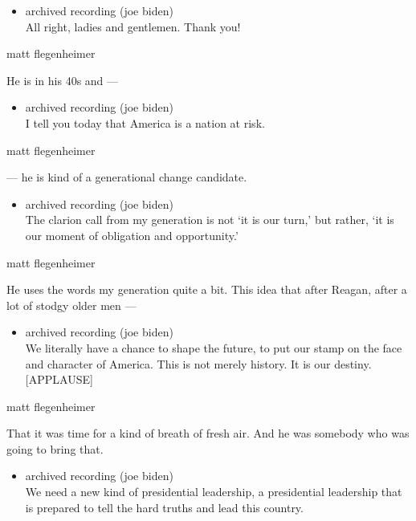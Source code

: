 \begin{itemize}
\tightlist
\item
  archived recording (joe biden)\\
  All right, ladies and gentlemen. Thank you!
\end{itemize}

matt flegenheimer

He is in his 40s and ---

\begin{itemize}
\tightlist
\item
  archived recording (joe biden)\\
  I tell you today that America is a nation at risk.
\end{itemize}

matt flegenheimer

--- he is kind of a generational change candidate.

\begin{itemize}
\tightlist
\item
  archived recording (joe biden)\\
  The clarion call from my generation is not `it is our turn,' but
  rather, `it is our moment of obligation and opportunity.'
\end{itemize}

matt flegenheimer

He uses the words my generation quite a bit. This idea that after
Reagan, after a lot of stodgy older men ---

\begin{itemize}
\tightlist
\item
  archived recording (joe biden)\\
  We literally have a chance to shape the future, to put our stamp on
  the face and character of America. This is not merely history. It is
  our destiny. {[}APPLAUSE{]}
\end{itemize}

matt flegenheimer

That it was time for a kind of breath of fresh air. And he was somebody
who was going to bring that.

\begin{itemize}
\tightlist
\item
  archived recording (joe biden)\\
  We need a new kind of presidential leadership, a presidential
  leadership that is prepared to tell the hard truths and lead this
  country.
\end{itemize}

